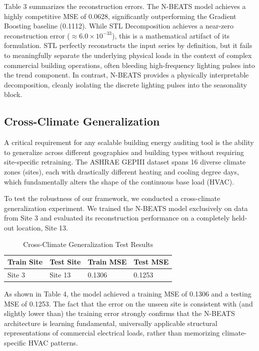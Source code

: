 Table 3 summarizes the reconstruction errors. The N-BEATS model achieves a highly competitive MSE of 0.0628, significantly outperforming the Gradient Boosting baseline (0.1112). While STL Decomposition achieves a near-zero reconstruction error ($\approx 6.0 \times 10^{-33}$), this is a mathematical artifact of its formulation. STL perfectly reconstructs the input series by definition, but it fails to meaningfully separate the underlying physical loads in the context of complex commercial building operations, often bleeding high-frequency lighting pulses into the trend component. In contrast, N-BEATS provides a physically interpretable decomposition, cleanly isolating the discrete lighting pulses into the seasonality block.

\subsection{Cross-Climate Generalization}
A critical requirement for any scalable building energy auditing tool is the ability to generalize across different geographies and building types without requiring site-specific retraining. The ASHRAE GEPIII dataset spans 16 diverse climate zones (sites), each with drastically different heating and cooling degree days, which fundamentally alters the shape of the continuous base load (HVAC).

To test the robustness of our framework, we conducted a cross-climate generalization experiment. We trained the N-BEATS model exclusively on data from Site 3 and evaluated its reconstruction performance on a completely held-out location, Site 13.

\begin{table}[H]
\caption{Cross-Climate Generalization Test Results}
\begin{center}
\begin{tabular}{l l l l}
\toprule
\textbf{Train Site} & \textbf{Test Site} & \textbf{Train MSE} & \textbf{Test MSE} \\
\midrule
Site 3 & Site 13 & 0.1306 & 0.1253 \\
\bottomrule
\end{tabular}
\end{center}
\end{table}

As shown in Table 4, the model achieved a training MSE of 0.1306 and a testing MSE of 0.1253. The fact that the error on the unseen site is consistent with (and slightly lower than) the training error strongly confirms that the N-BEATS architecture is learning fundamental, universally applicable structural representations of commercial electrical loads, rather than memorizing climate-specific HVAC patterns.

